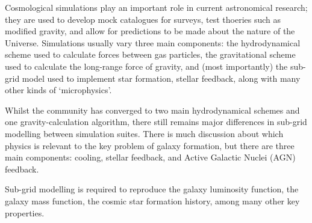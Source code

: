 Cosmological simulations play an important role in current astronomical
research; they are used to develop mock catalogues for surveys, test thoeries
such as modified gravity, and allow for predictions to be made about the
nature of the Universe. Simulations usually vary three main components:
the hydrodynamical scheme used to calculate forces between gas particles,
the gravitational scheme used to calculate the long-range force of gravity,
and (most importantly) the sub-grid model used to implement star formation,
stellar feedback, along with many other kinds of `microphysics'.

Whilst the community has converged to two main hydrodynamical schemes and one
gravity-calculation algorithm, there still remains major differences in
sub-grid modelling between simulation suites. There is much discussion about
which physics is relevant to the key problem of galaxy formation, but there
are three main components: cooling, stellar feedback, and Active Galactic
Nuclei (AGN) feedback.

Sub-grid modelling is required to reproduce the galaxy luminosity function,
the galaxy mass function, the cosmic star formation history, among many
other key properties.

